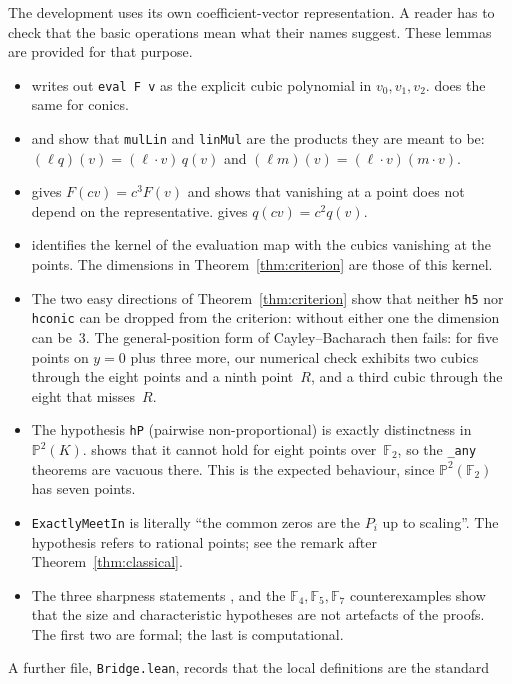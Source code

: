 \documentclass[11pt]{article}
\theoremstyle{definition}
\theoremstyle{remark}
\newcommand{\lean}[1]{\texttt{#1}}
\newcommand{\F}{\mathbb{F}}
\newcommand{\PP}{\mathbb{P}}
\begin{document}
The development uses its own coefficient-vector representation. A reader has to check that the
basic operations mean what their names suggest. These lemmas are provided for that purpose.
\begin{itemize}
\item {} writes out \lean{eval F v} as the explicit cubic polynomial in
$v_0,v_1,v_2$.  does the same for conics.
\item {} and  show that \lean{mulLin} and \lean{linMul} are
the products they are meant to be: $(\ell q)(v)=(\ell\cdot v)\,q(v)$ and
$(\ell m)(v)=(\ell\cdot v)(m\cdot v)$.
\item {} gives $F(cv)=c^3F(v)$ and  shows that
vanishing at a point does not depend on the representative.  gives
$q(cv)=c^2q(v)$.
\item {} identifies the kernel of the evaluation map with the cubics
vanishing at the points. The dimensions in Theorem~\ref{thm:criterion} are those of this kernel.
\item The two easy directions of Theorem~\ref{thm:criterion} show that neither \lean{h5} nor
\lean{hconic} can be dropped from the criterion: without either one the dimension can be~3. The
general-position form of Cayley--Bacharach then fails: for five points on $y=0$ plus three more, our numerical check exhibits two cubics through
the eight points and a ninth point~$R$, and a third cubic through the eight that misses~$R$.
\item The hypothesis \lean{hP} (pairwise non-proportional) is exactly distinctness in
$\PP^2(K)$.  shows that it cannot hold for eight points
over~$\F_2$, so the \lean{\_any} theorems are vacuous there. This is the expected behaviour,
since $\PP^2(\F_2)$ has seven points.
\item \lean{ExactlyMeetIn} is literally ``the common zeros are the $P_i$ up to scaling''. The
hypothesis refers to rational points; see the remark after Theorem~\ref{thm:classical}.
\item The three sharpness statements , 
and the $\F_4,\F_5,\F_7$ counterexamples show that the size and characteristic hypotheses are
not artefacts of the proofs. The first two are formal; the last is computational.
\end{itemize}
A further file, \texttt{Bridge.lean}, records that the local definitions are the standard
\end{document}
